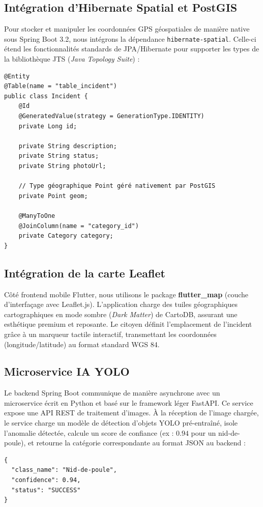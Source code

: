 \subsection{Intégration d'Hibernate Spatial et PostGIS}
Pour stocker et manipuler les coordonnées GPS géospatiales de manière native sous Spring Boot 3.2, nous intégrons la dépendance \texttt{hibernate-spatial}. Celle-ci étend les fonctionnalités standards de JPA/Hibernate pour supporter les types de la bibliothèque JTS (\textit{Java Topology Suite}) :

\begin{verbatim}
@Entity
@Table(name = "table_incident")
public class Incident {
    @Id
    @GeneratedValue(strategy = GenerationType.IDENTITY)
    private Long id;
    
    private String description;
    private String status;
    private String photoUrl;
    
    // Type géographique Point géré nativement par PostGIS
    private Point geom; 
    
    @ManyToOne
    @JoinColumn(name = "category_id")
    private Category category;
}
\end{verbatim}

\subsection{Intégration de la carte Leaflet}
Côté frontend mobile Flutter, nous utilisons le package \textbf{flutter\_map} (couche d'interfaçage avec Leaflet.js). L'application charge des tuiles géographiques cartographiques en mode sombre (\textit{Dark Matter}) de CartoDB, assurant une esthétique premium et reposante. Le citoyen définit l'emplacement de l'incident grâce à un marqueur tactile interactif, transmettant les coordonnées (longitude/latitude) au format standard WGS 84.

\subsection{Microservice IA YOLO}
Le backend Spring Boot communique de manière asynchrone avec un microservice écrit en Python et basé sur le framework léger FastAPI. Ce service expose une API REST de traitement d'images. À la réception de l'image chargée, le service charge un modèle de détection d'objets YOLO pré-entraîné, isole l'anomalie détectée, calcule un score de confiance (ex : $0.94$ pour un nid-de-poule), et retourne la catégorie correspondante au format JSON au backend :
\begin{verbatim}
{
  "class_name": "Nid-de-poule",
  "confidence": 0.94,
  "status": "SUCCESS"
}
\end{verbatim}

